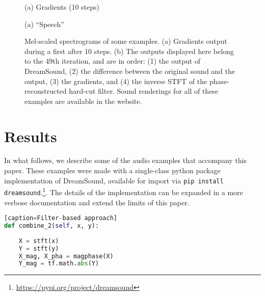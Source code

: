 \documentclass[a4paper,10pt,oneside]{article}
\begin{document}
\begin{sloppy}
\begin{figure}[h]
\begin{minipage}[h]{1\columnwidth}
  \centerline{}
  \centerline{(a) Gradients (10 steps)}\medskip
\end{minipage}
\begin{minipage}[h]{1\columnwidth}
  \centerline{}
  \centerline{(a) ``Speech''}\medskip
\end{minipage}
\caption{Mel-scaled spectrograms of some examples. (a) Gradients output during a first after 10 steps. (b) The outputs displayed here belong to the 49th iteration, and are in order: (1) the output of DreamSound, (2) the difference between the original sound and the output, (3) the gradients, and (4) the inverse STFT of the phase-reconstructed hard-cut filter. Sound renderings for all of these examples are available in the website.}
\label{fig:melspecs}
\end{figure}


\section{Results}

In what follows, we describe some of the audio examples that accompany this paper. These examples were made with a single-class python package implementation of DreamSound, available for import via \texttt{pip install dreamsound}.\footnote{\url{https://pypi.org/project/dreamsound}}. The details of the implementation can be expanded in a more verbose documentation and extend the limits of this paper. 



\begin{lstlisting}[language=Python][caption=Filter-based approach]
def combine_2(self, x, y):
    
    X = stft(x)
    Y = stft(y)
    X_mag, X_pha = magphase(X)
    Y_mag = tf.math.abs(Y)


\end{lstlisting}
\end{sloppy}
\end{document}
